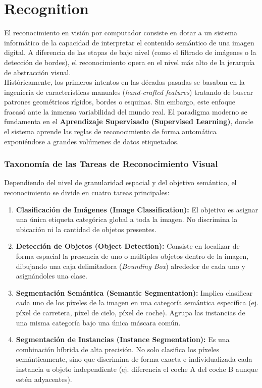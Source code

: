 \chapter{Recognition}

\noindent
El reconocimiento en visión por computador consiste en dotar a un sistema informático de la capacidad de interpretar el contenido semántico de una imagen digital. A diferencia de las etapas de bajo nivel (como el filtrado de imágenes o la detección de bordes), el reconocimiento opera en el nivel más alto de la jerarquía de abstracción visual. \\

\noindent
Históricamente, los primeros intentos en las décadas pasadas se basaban en la ingeniería de características manuales (\textit{hand-crafted features}) tratando de buscar patrones geométricos rígidos, bordes o esquinas. Sin embargo, este enfoque fracasó ante la inmensa variabilidad del mundo real. El paradigma moderno se fundamenta en el \textbf{Aprendizaje Supervisado (Supervised Learning)}, donde el sistema aprende las reglas de reconocimiento de forma automática exponiéndose a grandes volúmenes de datos etiquetados.

\subsection{Taxonomía de las Tareas de Reconocimiento Visual}
\noindent
Dependiendo del nivel de granularidad espacial y del objetivo semántico, el reconocimiento se divide en cuatro tareas principales:

\begin{enumerate}
    \item \textbf{Clasificación de Imágenes (Image Classification):} El objetivo es asignar una única etiqueta categórica global a toda la imagen. No discrimina la ubicación ni la cantidad de objetos presentes.
    \item \textbf{Detección de Objetos (Object Detection):} Consiste en localizar de forma espacial la presencia de uno o múltiples objetos dentro de la imagen, dibujando una caja delimitadora (\textit{Bounding Box}) alrededor de cada uno y asignándoles una clase.
    \item \textbf{Segmentación Semántica (Semantic Segmentation):} Implica clasificar cada uno de los píxeles de la imagen en una categoría semántica específica (ej. píxel de carretera, píxel de cielo, píxel de coche). Agrupa las instancias de una misma categoría bajo una única máscara común.
    \item \textbf{Segmentación de Instancias (Instance Segmentation):} Es una combinación híbrida de alta precisión. No solo clasifica los píxeles semánticamente, sino que discrimina de forma exacta e individualizada cada instancia u objeto independiente (ej. diferencia el coche A del coche B aunque estén adyacentes).
\end{enumerate}


